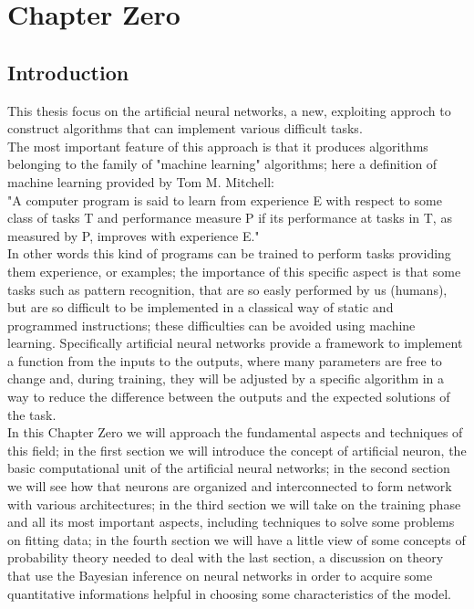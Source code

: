 
\chapter*{Chapter Zero} \setcounter{page}{1}

\section{Introduction}
This thesis focus on the artificial neural networks, a new, exploiting approch to construct algorithms that can implement various difficult tasks.\\
The most important feature of this approach is that it produces algorithms belonging to the family of "machine learning" algorithms; here a definition of machine learning provided by Tom M. Mitchell:\\
"A computer program is said to learn from experience E with respect to some class of tasks T and performance measure P if its performance at tasks in T, as measured by P, improves with experience E."\\
In other words this kind of programs can be trained to perform tasks providing them experience, or examples; the importance of this specific aspect is that some tasks such as pattern recognition, that are so easly performed by us (humans), but are so difficult to be implemented in a classical way of static and programmed instructions; these difficulties can be avoided using machine learning. Specifically artificial neural networks provide a framework to implement a function from the inputs to the outputs, where many parameters are free to change and, during training, they will be adjusted by a specific algorithm in a way to reduce the difference between the outputs and the expected solutions of the task.\\
In this Chapter Zero we will approach the fundamental aspects and techniques of this field; in the first section we will introduce the concept of artificial neuron, the basic computational unit of the artificial neural networks; in the second section we will see how that neurons are organized and interconnected to form network with various architectures; in the third section we will take on the training phase and all its most important aspects, including techniques to solve some problems on fitting data; in the fourth section we will have a little view of some concepts of probability theory needed to deal with the last section, a discussion on theory that use the Bayesian inference on neural networks in order to acquire some quantitative informations helpful in choosing some characteristics of the model.


